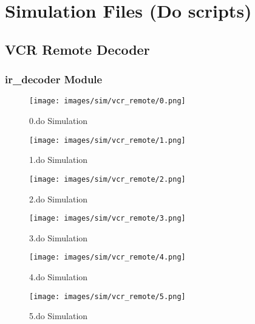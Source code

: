 \documentclass[a4paper]{article}
\makeatletter
\newcommand{\filecaption}[1]{\filename@parse{#1}\filename@base.\filename@ext}
\newcommand{\filelisting}[2][]{%
}
\makeatother
\begin{document}
\section{Simulation Files (Do scripts)}

\subsection{VCR Remote Decoder}

\subsubsection{ir\_decoder Module}
\filelisting[float]{../do_files/vcr_remote/setup.do}
\filelisting[float]{../do_files/vcr_remote/reset.do}
\filelisting[float]{../do_files/vcr_remote/0.do}
\begin{figure}[H]
	\centering
	\texttt{[image: images/sim/vcr\_remote/0.png]}
	\caption{0.do Simulation}
\end{figure}

\filelisting[float]{../do_files/vcr_remote/1.do}
\begin{figure}[H]
	\centering
	\texttt{[image: images/sim/vcr\_remote/1.png]}
	\caption{1.do Simulation}
\end{figure}

\filelisting[float]{../do_files/vcr_remote/2.do}
\begin{figure}[H]
	\centering
	\texttt{[image: images/sim/vcr\_remote/2.png]}
	\caption{2.do Simulation}
\end{figure}

\filelisting[float]{../do_files/vcr_remote/3.do}
\begin{figure}[H]
	\centering
	\texttt{[image: images/sim/vcr\_remote/3.png]}
	\caption{3.do Simulation}
\end{figure}

\filelisting[float]{../do_files/vcr_remote/4.do}
\begin{figure}[H]
	\centering
	\texttt{[image: images/sim/vcr\_remote/4.png]}
	\caption{4.do Simulation}
\end{figure}

\filelisting[float]{../do_files/vcr_remote/5.do}
\begin{figure}[H]
	\centering
	\texttt{[image: images/sim/vcr\_remote/5.png]}
	\caption{5.do Simulation}
\end{figure}
\end{document}
